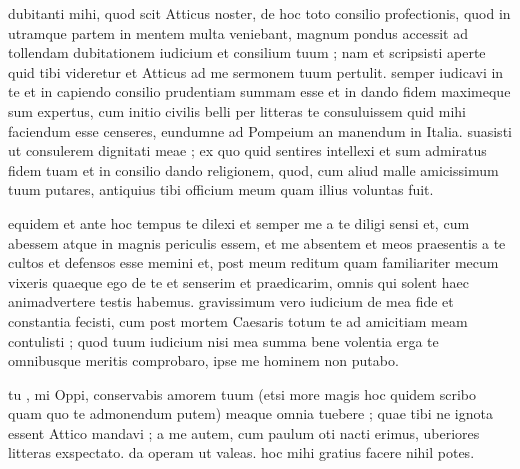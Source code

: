 


 dubitanti mihi, quod scit Atticus noster, de hoc toto consilio profectionis, quod in utramque partem in mentem multa veniebant, magnum pondus accessit ad tollendam dubitationem iudicium et consilium tuum ; nam et scripsisti aperte quid tibi videretur et Atticus ad me sermonem tuum pertulit. semper iudicavi in te et in capiendo consilio prudentiam summam esse et in dando fidem maximeque sum expertus, cum initio civilis belli per litteras te consuluissem quid mihi faciendum esse censeres, eundumne ad Pompeium an manendum in Italia. suasisti ut consulerem dignitati meae ; ex quo quid sentires intellexi et sum admiratus fidem tuam et in consilio dando religionem, quod, cum aliud malle amicissimum tuum putares, antiquius tibi officium meum quam illius voluntas fuit.

 equidem et ante hoc tempus te dilexi et semper me a te diligi sensi et, cum abessem atque in magnis periculis essem, et me absentem et meos praesentis a te cultos et defensos esse memini et, post meum reditum quam familiariter mecum vixeris quaeque ego de te et senserim et praedicarim, omnis qui solent haec animadvertere testis habemus. gravissimum vero iudicium de mea fide et constantia fecisti, cum post mortem Caesaris totum te ad amicitiam meam contulisti ; quod tuum iudicium nisi mea summa bene volentia erga te omnibusque meritis comprobaro, ipse me hominem non putabo.

 tu , mi Oppi, conservabis amorem tuum (etsi more magis hoc quidem scribo quam quo te admonendum putem) meaque omnia tuebere ; quae tibi ne ignota essent Attico mandavi ; a me autem, cum paulum oti nacti erimus, uberiores litteras exspectato. da operam ut valeas. hoc mihi gratius facere nihil potes.
